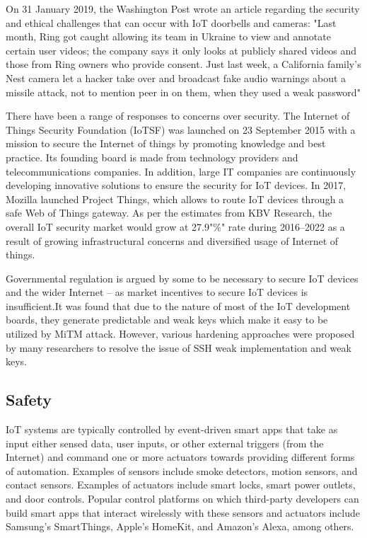\documentclass[12pt, a4paper, twoside]{article}
\begin{document}
On 31 January 2019, the Washington Post wrote an article regarding the security and ethical challenges that can occur with IoT doorbells and cameras: "Last month, Ring got caught allowing its team in Ukraine to view and annotate certain user videos; the company says it only looks at publicly shared videos and those from Ring owners who provide consent. Just last week, a California family’s Nest camera let a hacker take over and broadcast fake audio warnings about a missile attack, not to mention peer in on them, when they used a weak password"

There have been a range of responses to concerns over security. The Internet of Things Security Foundation (IoTSF) was launched on 23 September 2015 with a mission to secure the Internet of things by promoting knowledge and best practice. Its founding board is made from technology providers and telecommunications companies. In addition, large IT companies are continuously developing innovative solutions to ensure the security for IoT devices. In 2017, Mozilla launched Project Things, which allows to route IoT devices through a safe Web of Things gateway. As per the estimates from KBV Research, the overall IoT security market would grow at 27.9"\%" rate during 2016–2022 as a result of growing infrastructural concerns and diversified usage of Internet of things.

Governmental regulation is argued by some to be necessary to secure IoT devices and the wider Internet – as market incentives to secure IoT devices is insufficient.It was found that due to the nature of most of the IoT development boards, they generate predictable and weak keys which make it easy to be utilized by MiTM attack. However, various hardening approaches were proposed by many researchers to resolve the issue of SSH weak implementation and weak keys.

\subsection{Safety}
IoT systems are typically controlled by event-driven smart apps that take as input either sensed data, user inputs, or other external triggers (from the Internet) and command one or more actuators towards providing different forms of automation. Examples of sensors include smoke detectors, motion sensors, and contact sensors. Examples of actuators include smart locks, smart power outlets, and door controls. Popular control platforms on which third-party developers can build smart apps that interact wirelessly with these sensors and actuators include Samsung's SmartThings, Apple's HomeKit, and Amazon's Alexa, among others.
\end{document}
